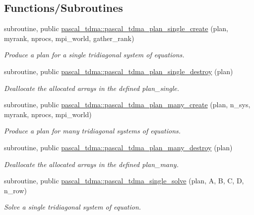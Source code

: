 \subsection*{Functions/\+Subroutines}
\begin{DoxyCompactItemize}
\item 
subroutine, public \mbox{\hyperlink{namespacepascal__tdma_a5dfc2d7c919b47ad364a74d141532a9f}{pascal\+\_\+tdma\+::pascal\+\_\+tdma\+\_\+plan\+\_\+single\+\_\+create}} (plan, myrank, nprocs, mpi\+\_\+world, gather\+\_\+rank)
\begin{DoxyCompactList}\small\item\em Produce a plan for a single tridiagonal system of equations. \end{DoxyCompactList}\item 
subroutine, public \mbox{\hyperlink{namespacepascal__tdma_adb04e59c740ce6c4b9518dd86eaeb594}{pascal\+\_\+tdma\+::pascal\+\_\+tdma\+\_\+plan\+\_\+single\+\_\+destroy}} (plan)
\begin{DoxyCompactList}\small\item\em Deallocate the allocated arrays in the defined plan\+\_\+single. \end{DoxyCompactList}\item 
subroutine, public \mbox{\hyperlink{namespacepascal__tdma_a7e9c24b343ae949044eccc8692dcc6e9}{pascal\+\_\+tdma\+::pascal\+\_\+tdma\+\_\+plan\+\_\+many\+\_\+create}} (plan, n\+\_\+sys, myrank, nprocs, mpi\+\_\+world)
\begin{DoxyCompactList}\small\item\em Produce a plan for many tridiagonal systems of equations. \end{DoxyCompactList}\item 
subroutine, public \mbox{\hyperlink{namespacepascal__tdma_a8438e6774617871b147af9ec8bdad6ce}{pascal\+\_\+tdma\+::pascal\+\_\+tdma\+\_\+plan\+\_\+many\+\_\+destroy}} (plan)
\begin{DoxyCompactList}\small\item\em Deallocate the allocated arrays in the defined plan\+\_\+many. \end{DoxyCompactList}\item 
subroutine, public \mbox{\hyperlink{namespacepascal__tdma_ab14e132231d4b53fd65dd333ccc85a50}{pascal\+\_\+tdma\+::pascal\+\_\+tdma\+\_\+single\+\_\+solve}} (plan, A, B, C, D, n\+\_\+row)
\begin{DoxyCompactList}\small\item\em Solve a single tridiagonal system of equation. \end{DoxyCompactList}\item 

\end{DoxyCompactItemize}
